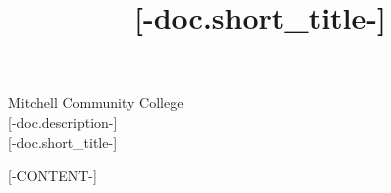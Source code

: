 \documentclass[draft]{article}
[# else #]
\title{[-doc.short_title-]}
\begin{document}
\begin{center}
    {\huge Mitchell Community College} \\[6pt]
    {\Large [-doc.description-]} \\[6pt]
    {\Large [-doc.short_title-]}
\end{center}
[-CONTENT-]
\end{document}
